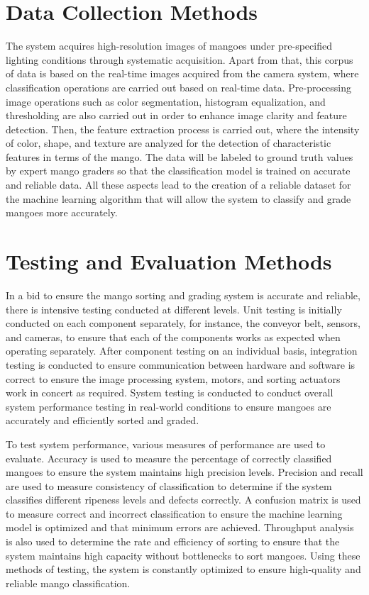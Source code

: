 \section{Data Collection Methods}
The system acquires high-resolution images of mangoes under pre-specified lighting conditions through systematic acquisition. Apart from that, this corpus of data is based on the real-time images acquired from the camera system, where classification operations are carried out based on real-time data. Pre-processing image operations such as color segmentation, histogram equalization, and thresholding are also carried out in order to enhance image clarity and feature detection. Then, the feature extraction process is carried out, where the intensity of color, shape, and texture are analyzed for the detection of characteristic features in terms of the mango. The data will be labeled to ground truth values by expert mango graders so that the classification model is trained on accurate and reliable data. All these aspects lead to the creation of a reliable dataset for the machine learning algorithm that will allow the system to classify and grade mangoes more accurately.

\section{Testing and Evaluation Methods}
In a bid to ensure the mango sorting and grading system is accurate and reliable, there is intensive testing conducted at different levels. Unit testing is initially conducted on each component separately, for instance, the conveyor belt, sensors, and cameras, to ensure that each of the components works as expected when operating separately. After component testing on an individual basis, integration testing is conducted to ensure communication between hardware and software is correct to ensure the image processing system, motors, and sorting actuators work in concert as required. System testing is conducted to conduct overall system performance testing in real-world conditions to ensure mangoes are accurately and efficiently sorted and graded.

To test system performance, various measures of performance are used to evaluate. Accuracy is used to measure the percentage of correctly classified mangoes to ensure the system maintains high precision levels. Precision and recall are used to measure consistency of classification to determine if the system classifies different ripeness levels and defects correctly. A confusion matrix is used to measure correct and incorrect classification to ensure the machine learning model is optimized and that minimum errors are achieved. Throughput analysis is also used to determine the rate and efficiency of sorting to ensure that the system maintains high capacity without bottlenecks to sort mangoes. Using these methods of testing, the system is constantly optimized to ensure high-quality and reliable mango classification.

